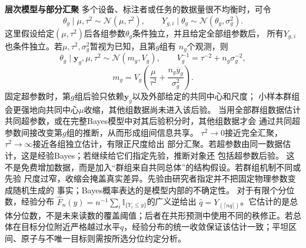 \par\medskip\noindent\textbf{层次模型与部分汇聚}\quad
多个设备、标注者或任务的数据量很不均衡时，可令
\[
  \theta_g\mid\mu,\tau^2\sim\mathcal N(\mu,\tau^2),\qquad
  Y_{g,i}\mid\theta_g\sim\mathcal N(\theta_g,\sigma_g^2).
\]
这里假设给定\((\mu,\tau^2)\)后各组参数\(\theta_g\)条件独立，并且给定全部组参数后，
所有\(Y_{g,i}\)也条件独立。若\(\mu,\tau^2,\sigma_g^2\)暂视为已知，且第\(g\)组有
\(n_g\)个观测，则
\[
  \theta_g\mid\bm y_g,\mu,\tau^2
  \sim\mathcal N(m_g,V_g),\qquad
  V_g^{-1}=\tau^{-2}+n_g\sigma_g^{-2},
\]
\[
  m_g
  =V_g\left(\frac{\mu}{\tau^2}
    +\frac{n_g\overline y_g}{\sigma_g^2}\right).
\]
固定超参数时，第\(g\)组后验只依赖\(\bm y_g\)以及外部给定的共同中心和尺度；
小样本群组会更强地向共同中心\(\mu\)收缩，其他组数据尚未进入该后验。
当用全部群组数据估计共同超参数，或在完整Bayes模型中对其后验积分时，其他组数据才会
通过共同超参数间接改变第\(g\)组的推断，从而形成组间信息共享。
\(\tau^2\to0\)接近完全汇聚，\(\tau^2\to\infty\)接近各组独立估计，有限正尺度给出
部分汇聚。若超参数由同一数据估计，这是经验Bayes；若继续给它们指定先验，推断对象还
包括超参数后验。
这不是免费增加数据，而是加入“群组来自共同总体”的结构假设。若群组机制不同或先验
尺度过窄，收缩会掩盖真实差异。先验由研究者指定并不把固定物理参数变成随机生成的
事实；Bayes概率表达的是模型内部的不确定性。
对于有限个分位数，经验分布
\(\widehat F_n(y)=n^{-1}\sum_i\mathbb I_{\{Y_i\leq y\}}\)的广义逆给出
\(\widehat q=Y_{(\lceil nq\rceil)}\)。它估计的是总体分位数，不是未来读数的覆盖阈值；后者在共形预测中使用不同的秩修正。若总体在目标分位附近严格越过水平\(q\)，经验分布的统一收敛保证该估计一致；平坦区间、原子与不唯一目标则需按所选分位约定分析。

